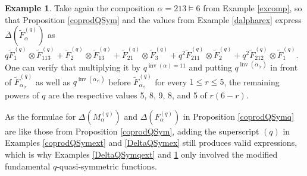 \documentclass{article}
\theoremstyle{definition}
\newtheorem{ex}[thm]{Example}
\begin{document}
\begin{ex}
Take again the composition $\alpha=213\vDash6$ from Example \ref{excomp}, so that Proposition \ref{coprodQSym} and the values from Example \ref{dalpharex} express $\overline{\Delta}(\widetilde{F}_{\alpha}^{(q)})$ as $q\widetilde{F}_{1}^{(q)}\otimes\widetilde{F}_{113}^{(q)}+\widetilde{F}_{2}^{(q)}\otimes\widetilde{F}_{13}^{(q)}+\widetilde{F}_{21}^{(q)}\otimes \widetilde{F}_{3}^{(q)}+q^{2}\widetilde{F}_{211}^{(q)}\otimes\widetilde{F}_{2}^{(q)}+q^{2}\widetilde{F}_{212}^{(q)}\otimes\widetilde{F}_{1}^{(q)}$. One can verify that multiplying it by $q^{\operatorname{inv}(\alpha)=11}$ and putting $q^{\operatorname{inv}(\alpha_{|r})}$ in front of $\widetilde{F}_{\alpha_{|r}}^{(q)}$ as well as $q^{\operatorname{inv}(\alpha_{r|})}$ before $\widetilde{F}_{\alpha_{r|}}^{(q)}$ for every $1 \leq r\leq5$, the remaining powers of $q$ are the respective values 5, 8, 9, 8, and 5 of $r(6-r)$. \label{coprodQSymqex}
\end{ex}
As the formulae for $\Delta(M_{\alpha}^{(q)})$ and $\Delta(F_{\alpha}^{(q)})$ in Proposition \ref{coprodQSymq} are like those from Proposition \ref{coprodQSym}, adding the superscript $(q)$ in Examples \ref{coprodQSymext} and \ref{DeltaQSymex} still produces valid expressions, which is why Examples \ref{DeltaQSymqext} and \ref{coprodQSymqex} only involved the modified fundamental $q$-quasi-symmetric functions.

\medskip
\end{document}
